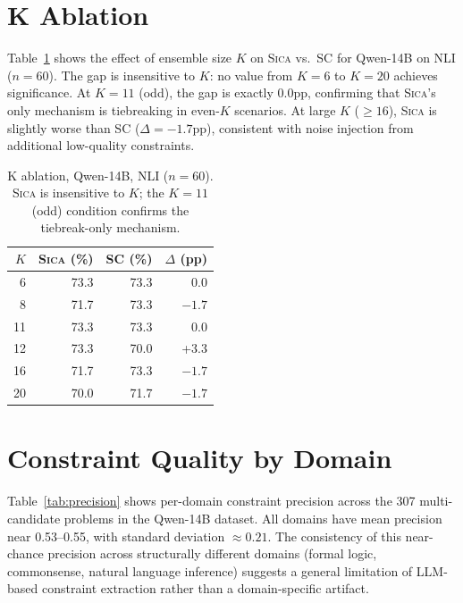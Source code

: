 \documentclass[11pt,a4paper]{article}
\newcommand{\sica}{\textsc{Sica}}
\begin{document}
\appendix

\section{K Ablation}
\label{app:k_ablation}

Table~\ref{tab:k_ablation} shows the effect of ensemble size $K$ on \sica{} vs.\ SC for Qwen-14B on NLI ($n = 60$). The gap is insensitive to $K$: no value from $K=6$ to $K=20$ achieves significance. At $K = 11$ (odd), the gap is exactly 0.0pp, confirming that \sica{}'s only mechanism is tiebreaking in even-$K$ scenarios. At large $K$ ($\geq 16$), \sica{} is slightly worse than SC ($\Delta = -1.7$pp), consistent with noise injection from additional low-quality constraints.

\begin{table}[h]
\centering
\caption{K ablation, Qwen-14B, NLI ($n = 60$). \sica{} is insensitive to $K$; the $K=11$ (odd) condition confirms the tiebreak-only mechanism.}
\label{tab:k_ablation}
\small
\begin{tabular}{rrrr}
\toprule
\textbf{$K$} & \textbf{\sica{} (\%)} & \textbf{SC (\%)} & \textbf{$\Delta$ (pp)} \\
\midrule
6  & 73.3 & 73.3 & 0.0 \\
8  & 71.7 & 73.3 & $-1.7$ \\
11 & 73.3 & 73.3 & 0.0 \\
12 & 73.3 & 70.0 & +3.3 \\
16 & 71.7 & 73.3 & $-1.7$ \\
20 & 70.0 & 71.7 & $-1.7$ \\
\bottomrule
\end{tabular}
\end{table}

\section{Constraint Quality by Domain}
\label{app:constraint_quality}

Table~\ref{tab:precision} shows per-domain constraint precision across the 307 multi-candidate problems in the Qwen-14B dataset. All domains have mean precision near 0.53--0.55, with standard deviation $\approx 0.21$. The consistency of this near-chance precision across structurally different domains (formal logic, commonsense, natural language inference) suggests a general limitation of LLM-based constraint extraction rather than a domain-specific artifact.
\end{document}
